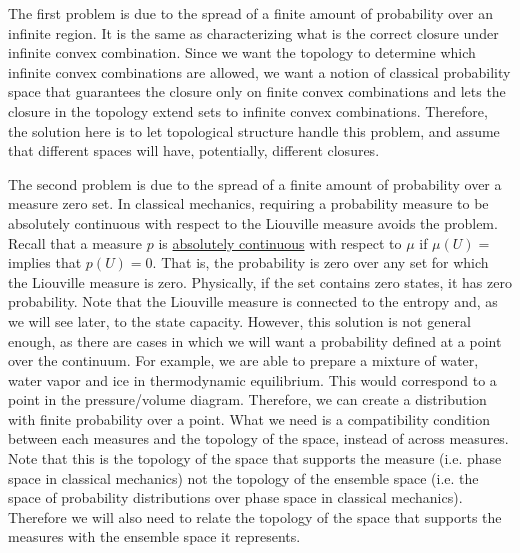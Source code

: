 The first problem is due to the spread of a finite amount of probability over an infinite region. It is the same as characterizing what is the correct closure under infinite convex combination. Since we want the topology to determine which infinite convex combinations are allowed, we want a notion of classical probability space that guarantees the closure only on finite convex combinations and lets the closure in the topology extend sets to infinite convex combinations. Therefore, the solution here is to let topological structure handle this problem, and assume that different spaces will have, potentially, different closures.

The second problem is due to the spread of a finite amount of probability over a measure zero set. In classical mechanics, requiring a probability measure to be absolutely continuous with respect to the Liouville measure avoids the problem. Recall that a measure $p$ is \href{https://en.wikipedia.org/wiki/Absolute_continuity#Absolute_continuity_of_measures}{absolutely continuous} with respect to $\mu$ if $\mu(U) = $ implies that $p(U)=0$. That is, the probability is zero over any set for which the Liouville measure is zero. Physically, if the set contains zero states, it has zero probability. Note that the Liouville measure is connected to the entropy and, as we will see later, to the state capacity. However, this solution is not general enough, as there are cases in which we will want a probability defined at a point over the continuum. For example, we are able to prepare a mixture of water, water vapor and ice in thermodynamic equilibrium. This would correspond to a point in the pressure/volume diagram. Therefore, we can create a distribution with finite probability over a point. What we need is a compatibility condition between each measures and the topology of the space, instead of across measures. Note that this is the topology of the space that supports the measure (i.e. phase space in classical mechanics) not the topology of the ensemble space (i.e. the space of probability distributions over phase space in classical mechanics). Therefore we will also need to relate the topology of the space that supports the measures with the ensemble space it represents.

